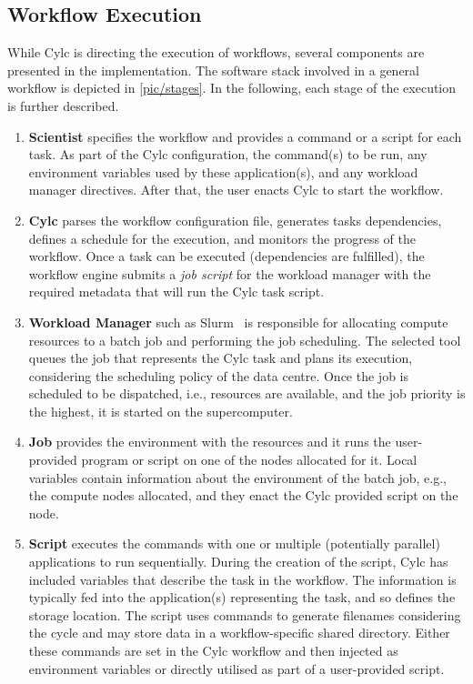 \documentclass{superfri}
\begin{document}
\subsection{Workflow Execution}

While Cylc is directing the execution of workflows, several components are presented in the implementation.
The software stack involved in a general workflow is depicted in \cref{pic/stages}.
In the following, each stage of the execution is further described.


\begin{enumerate}

  \item \textbf{Scientist} specifies the workflow and provides a command or a script for each task.
  As part of the Cylc configuration, the command(s) to be run, any environment variables used by these application(s), and any workload manager directives.
  After that, the user enacts Cylc to start the workflow.

  \item \textbf{Cylc} parses the workflow configuration file, generates tasks dependencies, defines a schedule for the execution, and monitors the progress of the workflow.
  Once a task can be executed (dependencies are fulfilled), the workflow engine submits a \textit{job script} for the workload manager with the required metadata that will run the Cylc task script.

  \item \textbf{Workload Manager} such as Slurm~\cite{Jette02slurm:simple} is responsible for allocating compute resources to a batch job and performing the job scheduling.
  The selected tool queues the job that represents the Cylc task and plans its execution, considering the scheduling policy of the data centre.
  Once the job is scheduled to be dispatched, i.e., resources are available, and the job priority is the highest, it is started on the supercomputer.

  \item \textbf{Job} provides the environment with the resources and it runs the user-provided program or script on one of the nodes allocated for it.
  Local variables contain information about the environment of the batch job, e.g., the compute nodes allocated, and they enact the Cylc provided script on the node.

  \item \textbf{Script} executes the commands with one or multiple (potentially parallel) applications to run sequentially.
  During the creation of the script, Cylc has included variables that describe the task in the workflow.
  The information is typically fed into the application(s) representing the task, and so defines the storage location.
  The script uses commands to generate filenames considering the cycle and may store data in a workflow-specific shared directory.
  Either these commands are set in the Cylc workflow and then injected as environment variables or directly utilised as part of a user-provided script.


\end{enumerate}
\end{document}
